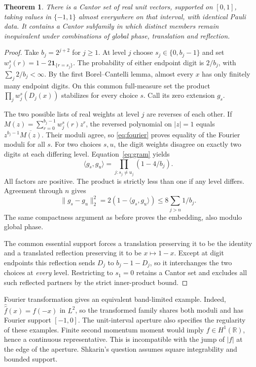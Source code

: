 \documentclass[11pt,reqno]{amsart}
\newtheorem{thm}{Theorem}
\newcommand{\R}{\mathbb R}
\newcommand{\one}{\mathbf 1}
\begin{document}
\begin{thm}\label{thm:real}
There is a Cantor set of real unit vectors, supported on \([0,1]\), taking values in \(\{-1,1\}\) almost everywhere on that interval, with identical Pauli data. It contains a Cantor subfamily in which distinct members remain inequivalent under combinations of global phase, translation and reflection.
\end{thm}
\begin{proof}
Take \(b_j=2^{j+2}\) for \(j\ge1\). At level \(j\) choose \(s_j\in\{0,b_j-1\}\) and set \(w_j^s(r)=1-2\one_{\{r=s_j\}}\). The probability of either endpoint digit is \(2/b_j\), with \(\sum_j2/b_j<\infty\). By the first Borel--Cantelli lemma, almost every \(x\) has only finitely many endpoint digits. On this common full-measure set the product \(\prod_j w_j^s(D_j(x))\) stabilizes for every choice \(s\). Call its zero extension \(g_s\).

The two possible lists of real weights at level \(j\) are reverses of each other. If \(M(z)=\sum_{r=0}^{b_j-1}w_j^s(r)z^r\), the reversed polynomial on \(|z|=1\) equals \(z^{b_j-1}\overline{M(z)}\). Their moduli agree, so \eqref{eq:fourier} proves equality of the Fourier moduli for all \(s\). For two choices \(s,u\), the digit weights disagree on exactly two digits at each differing level. Equation~\eqref{eq:gram} yields
\[
 \langle g_s,g_u\rangle
   =\prod_{j:s_j\ne u_j}(1-4/b_j).
\]
All factors are positive. The product is strictly less than one if any level differs. Agreement through \(n\) gives
\[
 \|g_s-g_u\|_2^2=2(1-\langle g_s,g_u\rangle)
 \le 8\sum_{j>n}1/b_j.
\]
The same compactness argument as before proves the embedding, also modulo global phase.

The common essential support forces a translation preserving it to be the identity and a translated reflection preserving it to be \(x\mapsto1-x\). Except at digit endpoints this reflection sends \(D_j\) to \(b_j-1-D_j\), so it interchanges the two choices at \emph{every} level. Restricting to \(s_1=0\) retains a Cantor set and excludes all such reflected partners by the strict inner-product bound.
\end{proof}

Fourier transformation gives an equivalent band-limited example. Indeed, \(\widehat{\widehat f}(x)=f(-x)\) in \(L^2\), so the transformed family shares both moduli and has Fourier support \([-1,0]\). The unit-interval aperture also specifies the regularity of these examples. Finite second momentum moment would imply \(f\in H^1(\R)\), hence a continuous representative. This is incompatible with the jump of \(|f|\) at the edge of the aperture. Shkarin's question assumes square integrability and bounded support.
\end{document}
